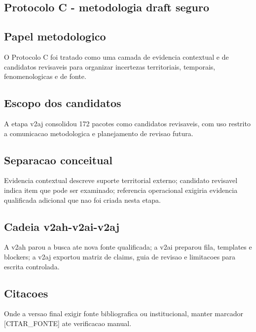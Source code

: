 
\subsection{Protocolo C - metodologia draft seguro}

\subsection{Papel metodologico}
O Protocolo C foi tratado como uma camada de evidencia contextual e de candidatos revisaveis para organizar incertezas territoriais, temporais, fenomenologicas e de fonte.

\subsection{Escopo dos candidatos}
A etapa v2aj consolidou 172 pacotes como candidatos revisaveis, com uso restrito a comunicacao metodologica e planejamento de revisao futura.

\subsection{Separacao conceitual}
Evidencia contextual descreve suporte territorial externo; candidato revisavel indica item que pode ser examinado; referencia operacional exigiria evidencia qualificada adicional que nao foi criada nesta etapa.

\subsection{Cadeia v2ah-v2ai-v2aj}
A v2ah parou a busca ate nova fonte qualificada; a v2ai preparou fila, templates e blockers; a v2aj exportou matriz de claims, guia de revisao e limitacoes para escrita controlada.

\subsection{Citacoes}
Onde a versao final exigir fonte bibliografica ou institucional, manter marcador [CITAR\_FONTE] ate verificacao manual.
